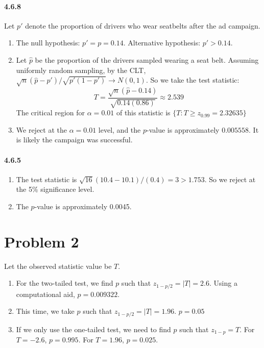 \documentclass[10pt,letter]{article}
\begin{document}
\paragraph*{4.6.8}
Let $p'$ denote the proportion of drivers who wear seatbelts after the ad campaign.
\begin{enumerate}[label=(\alph*)]
\item The null hypothesis: $p' = p = 0.14$. Alternative hypothesis: $p' > 0.14$.
\item Let $\hat{p}$ be the proportion of the drivers sampled wearing a seat belt. Assuming uniformly random sampling, by the CLT, $\sqrt{n}(\hat{p} - p')/\sqrt{p'(1-p')} \to N(0,1)$. So we take the test statistic:
\[ T = \frac{\sqrt{n} (\hat{p} - 0.14)}{\sqrt{0.14(0.86)}} \approx 2.539 \]
The critical region for $\alpha = 0.01$ of this statistic is $\{ T: T \ge z_{0.99} = 2.32635 \}$
\item We reject at the $\alpha = 0.01$ level, and the $p$-value is approximately $0.005558$. It is likely the campaign was successful.
\end{enumerate}
\paragraph*{4.6.5}
\begin{enumerate}[label=(\alph*)]
\item The test statistic is $\sqrt{16}(10.4-10.1)/(0.4) = 3 > 1.753$. So we reject at the 5\% significance level.
\item The $p$-value is approximately 0.0045.
\end{enumerate}
\section*{Problem 2}
Let the observed statistic value be $T$.
\begin{enumerate}[label=(\alph*)]
  \item For the two-tailed test, we find $p$ such that $z_{1 - p/2} = |T| = 2.6$. Using a computational aid, $p = 0.009322$.
  \item This time, we take $p$ such that $z_{1 - p/2} = |T| = 1.96$. $p = 0.05$
  \item If we only use the one-tailed test, we need to find $p$ such that $z_{1-p} = T$. For $T = -2.6$, $p = 0.995$. For $T = 1.96$, $p = 0.025$.
\end{enumerate}
\end{document}
